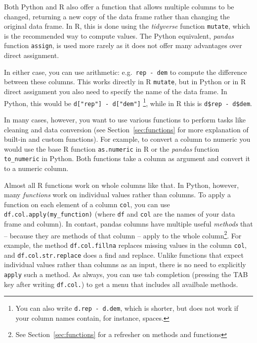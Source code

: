 Both Python and R also offer a function that allows multiple columns to be changed,
returning a new copy of the data frame rather than changing the original data frame.
In R, this is done using the \emph{tidyverse} function \texttt{mutate}, which is the recommended way to compute values.
The Python equivalent, \emph{pandas} function \texttt{assign}, is used more rarely as it does not offer many advantages over direct assignment.

In either case, you can use arithmetic: e.g.\ \verb|rep - dem| to compute the difference between these columns.
This works directly in R \texttt{mutate},
but in Python or in R direct assignment you also need to specify the name of the data frame.
In Python, this would be \verb+d["rep"] - d["dem"]+ \footnote{You can also write \texttt{d.rep - d.dem}, which is shorter, but does not work if your column names contain, for instance, spaces.}, while in R this is \verb+d$rep - d$dem+.

In many cases, however, you want to use various functions to perform tasks like cleaning and data conversion
(see Section~\ref{sec:functions} for more explanation of built-in and custom functions).
For example, to convert a column to numeric you would use the base R function \texttt{as.numeric} in R or the \emph{pandas} function \texttt{to\_numeric} in Python.
Both functions take a column as argument and convert it to a numeric column.

Almost all R functions work on whole columns like that.
In Python, however, many \emph{functions} work on individual values rather than columns.
To apply a function on each element of a column \verb+col+, you can use \verb+df.col.apply(my_function)+
(where \texttt{df} and \texttt{col} are the names of your data frame and column).
In contast, pandas columns have multiple useful \emph{methods} that -- because they are methods
of that column -- apply to the whole column\footnote{See Section~\ref{sec:functions} for a refresher on methods and functions}.
For example, the method \verb+df.col.fillna+ replaces
missing values in the column \verb+col+, and \verb+df.col.str.replace+ does a find and replace.
Unlike functions that expect individual values rather than columns as an input, there is no need to explicitly \verb+apply+ such a method.
As always, you can use tab completion (pressing the TAB key after writing \texttt{df.col.}) to get a menu that includes all availbale methods.

